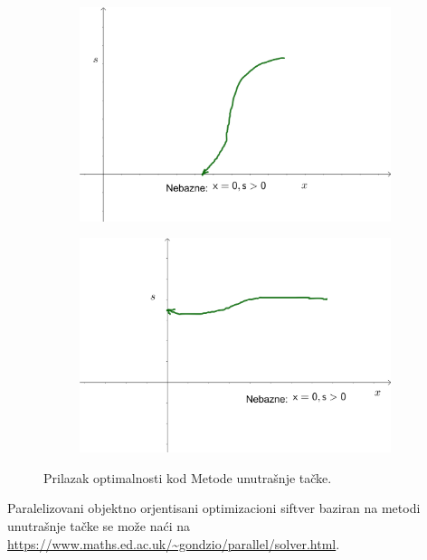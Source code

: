 \documentclass[a4paper, utf8, 11pt, colorlinks]{book}
\begin{document}
\begin{figure}
	\centering
	\begin{subfigure}{.45\textwidth}
	\centering
	\includegraphics[width=.9\linewidth]{interior-3}  
\end{subfigure}
\begin{subfigure}{.45\textwidth}
	\centering
	\includegraphics[width=.9\linewidth]{interior-4}  
\end{subfigure}
  \caption{Prilazak optimalnosti kod Metode unutrašnje tačke.}
   \label{fig:optimality-approaching-interior}
\end{figure}
Paralelizovani objektno orjentisani optimizacioni siftver baziran na metodi unutrašnje tačke se može naći na 
\url{https://www.maths.ed.ac.uk/~gondzio/parallel/solver.html}.  \\
\end{document}
